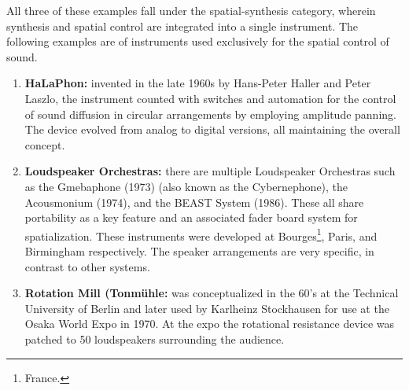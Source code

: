 All three of these examples fall under the spatial-synthesis category, wherein synthesis and spatial control are integrated into a single instrument. The following examples are of instruments used exclusively for the spatial control of sound.


\begin{enumerate}

    \item \textbf{HaLaPhon:} invented in the late 1960s by Hans-Peter Haller and Peter Laszlo, the instrument counted with switches and automation for the control of sound diffusion in circular arrangements by employing amplitude panning. The device evolved from analog to digital versions, all maintaining the overall concept.
    
    \item \textbf{Loudspeaker Orchestras:} there are multiple Loudspeaker Orchestras such as the Gmebaphone (1973) (also known as the Cybernephone), the Acousmonium (1974), and the BEAST System (1986). These all share portability as a key feature and an associated fader board system for spatialization. These instruments were developed at Bourges\footnote{France.}, Paris, and Birmingham respectively. The speaker arrangements are very specific, in contrast to other systems.
    
    
    
    
    \item \textbf{Rotation Mill (Tonmühle:} was conceptualized in the 60's at the Technical University of Berlin and later used by Karlheinz Stockhausen for use at the Osaka World Expo in 1970. At the expo the rotational resistance device was patched to 50 loudspeakers surrounding the audience.
    
    

\end{enumerate}
